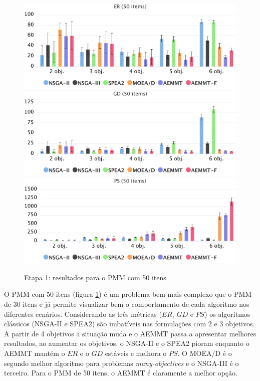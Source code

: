 \begin{figure}[!htbp]
	\caption{Etapa 1: resultados para o PMM com 50 itens}
	\label{fig_exp1_pmm_50}
	\includegraphics[width=1\textwidth]{cap_experimentos/figs/etapa1/er-mkp-50}
	\includegraphics[width=1\textwidth]{cap_experimentos/figs/etapa1/gd-mkp-50}
	\includegraphics[width=1\textwidth]{cap_experimentos/figs/etapa1/ps-mkp-50}
\end{figure}

O PMM com 50 itens (figura \ref{fig_exp1_pmm_50}) é um problema bem mais complexo que o PMM de 30 itens e já permite visualizar bem o comportamento de cada algoritmo nos diferentes cenários. Considerando as três métricas ($ER$, $GD$ e $PS$) os algoritmos clássicos (NSGA-II e SPEA2) são imbatíveis nas formulações com 2 e 3 objetivos. A partir de 4 objetivos a situação muda e o AEMMT passa a apresentar melhores resultados, ao aumentar os objetivos, o NSGA-II e o SPEA2 pioram enquanto o AEMMT mantém o $ER$ e o $GD$ estáveis e melhora o $PS$. O MOEA/D é o segundo melhor algoritmo para problemas \textit{many-objectives} e o NSGA-III é o terceiro. Para o PMM de 50 itens, o AEMMT é claramente a melhor opção.

